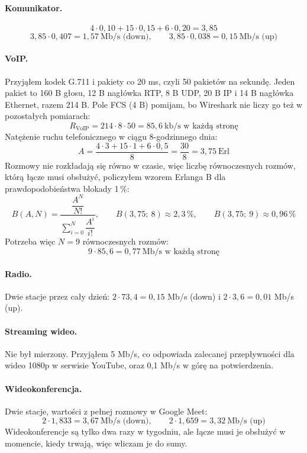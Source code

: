 \documentclass[12pt,a4paper]{article}
\begin{document}
\paragraph{Komunikator.}
\[
4 \cdot 0{,}10 + 15 \cdot 0{,}15 + 6 \cdot 0{,}20 = 3{,}85
\]
\[
3{,}85 \cdot 0{,}407 = 1{,}57\ \text{Mb/s (down)}, \qquad 3{,}85 \cdot 0{,}038 = 0{,}15\ \text{Mb/s (up)}
\]

\paragraph{VoIP.} Przyjąłem kodek G.711 i pakiety co 20 ms, czyli 50 pakietów na sekundę.
Jeden pakiet to 160 B głosu, 12 B nagłówka RTP, 8 B UDP, 20 B IP i 14 B nagłówka Ethernet,
razem 214 B. Pole FCS (4 B) pomijam, bo Wireshark nie liczy go też w pozostałych pomiarach:
\[
R_{\text{VoIP}} = 214 \cdot 8 \cdot 50 = 85{,}6\ \text{kb/s w każdą stronę}
\]
Natężenie ruchu telefonicznego w ciągu 8\nobreakdash-godzinnego dnia:
\[
A = \frac{4 \cdot 3 + 15 \cdot 1 + 6 \cdot 0{,}5}{8} = \frac{30}{8} = 3{,}75\ \text{Erl}
\]
Rozmowy nie rozkładają się równo w czasie, więc liczbę równoczesnych rozmów, którą łącze musi
obsłużyć, policzyłem wzorem Erlanga B dla prawdopodobieństwa blokady 1\,\%:
\[
B(A, N) = \frac{\dfrac{A^N}{N!}}{\displaystyle\sum_{i=0}^{N} \dfrac{A^i}{i!}}, \qquad
B(3{,}75;\ 8) \approx 2{,}3\,\%, \qquad B(3{,}75;\ 9) \approx 0{,}96\,\%
\]
Potrzeba więc $N = 9$ równoczesnych rozmów:
\[
9 \cdot 85{,}6 = 0{,}77\ \text{Mb/s w każdą stronę}
\]

\paragraph{Radio.} Dwie stacje przez cały dzień:
$2 \cdot 73{,}4 = 0{,}15$ Mb/s (down) i $2 \cdot 3{,}6 = 0{,}01$ Mb/s (up).

\paragraph{Streaming wideo.} Nie był mierzony. Przyjąłem 5 Mb/s, co odpowiada zalecanej
przepływności dla wideo 1080p w serwisie YouTube, oraz 0,1 Mb/s w górę na potwierdzenia.

\paragraph{Wideokonferencja.} Dwie stacje, wartości z pełnej rozmowy w Google Meet:
\[
2 \cdot 1{,}833 = 3{,}67\ \text{Mb/s (down)}, \qquad 2 \cdot 1{,}659 = 3{,}32\ \text{Mb/s (up)}
\]
Wideokonferencje są tylko dwa razy w tygodniu, ale łącze musi je obsłużyć w momencie, kiedy trwają,
więc wliczam je do sumy.
\end{document}
